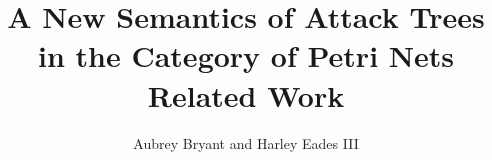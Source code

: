 \documentclass {article}
\title{A New Semantics of Attack Trees in the Category of Petri Nets\\\medskip Related Work}
\author{Aubrey Bryant and Harley Eades III}
\begin{document}
\maketitle
\nocite{*}


\end{document}
